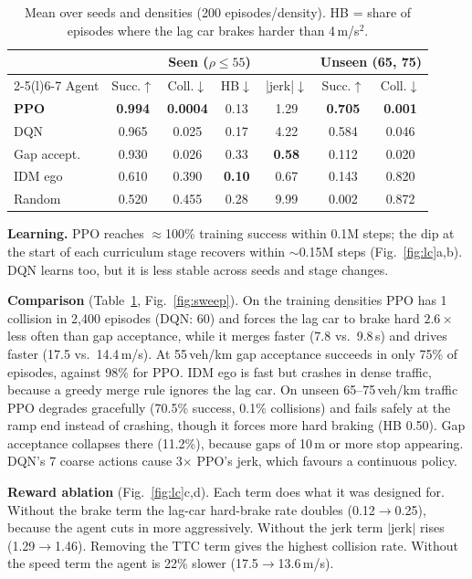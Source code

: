 \documentclass[conference,10pt]{IEEEtran}
\begin{document}
\begin{table}[t]
\centering
\caption{Mean over seeds and densities (200 episodes/density). HB = share of
episodes where the lag car brakes harder than 4\,m/s$^2$.}
\label{tab:main}
\setlength{\tabcolsep}{3.2pt}
\footnotesize
\begin{tabular}{@{}lcccccc@{}}
\toprule
 & \multicolumn{4}{c}{Seen ($\rho\le55$)} & \multicolumn{2}{c}{Unseen (65, 75)}\\
\cmidrule(lr){2-5}\cmidrule(l){6-7}
Agent & Succ.$\uparrow$ & Coll.$\downarrow$ & HB$\downarrow$ & |jerk|$\downarrow$ & Succ.$\uparrow$ & Coll.$\downarrow$\\
\midrule
\textbf{PPO}   & \textbf{0.994} & \textbf{0.0004} & 0.13 & 1.29 & \textbf{0.705} & \textbf{0.001}\\
DQN            & 0.965 & 0.025 & 0.17 & 4.22 & 0.584 & 0.046\\
Gap accept.    & 0.930 & 0.026 & 0.33 & \textbf{0.58} & 0.112 & 0.020\\
IDM ego        & 0.610 & 0.390 & \textbf{0.10} & 0.67 & 0.143 & 0.820\\
Random         & 0.520 & 0.455 & 0.28 & 9.99 & 0.002 & 0.872\\
\bottomrule
\end{tabular}
\end{table}

\textbf{Learning.} PPO reaches $\approx$100\% training success within 0.1M
steps; the dip at the start of each curriculum stage recovers within $\sim$0.15M
steps (Fig.~\ref{fig:lc}a,b). DQN learns too, but it is less stable across seeds
and stage changes.

\textbf{Comparison} (Table~\ref{tab:main}, Fig.~\ref{fig:sweep}). On the
training densities PPO has 1 collision in 2{,}400 episodes (DQN: 60) and
forces the lag car to brake hard $2.6\times$ less often than gap acceptance,
while it merges faster (7.8 vs.\ 9.8\,s) and drives faster (17.5 vs.\
14.4\,m/s). At 55\,veh/km gap acceptance succeeds in only 75\% of episodes,
against 98\% for PPO. IDM ego is fast but crashes in dense traffic, because a
greedy merge rule ignores the lag car. On unseen 65--75\,veh/km traffic PPO
degrades gracefully (70.5\% success, 0.1\% collisions) and fails safely at the
ramp end instead of crashing, though it forces more hard braking (HB 0.50). Gap acceptance collapses there (11.2\%), because
gaps of 10\,m or more stop appearing. DQN's 7 coarse actions cause
3$\times$ PPO's jerk, which favours a continuous policy.

\textbf{Reward ablation} (Fig.~\ref{fig:lc}c,d). Each term does what it was
designed for. Without the brake term the lag-car hard-brake rate doubles
(0.12$\to$0.25), because the agent cuts in more aggressively. Without the
jerk term $|$jerk$|$ rises (1.29$\to$1.46). Removing the TTC term gives the
highest collision rate. Without the speed term the agent is 22\% slower (17.5$\to$13.6\,m/s).
\end{document}
